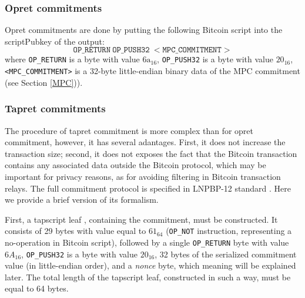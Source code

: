 \documentclass[9pt,oneside]{amsart}
\begin{document}
\begin{multicols}{2}
\subsubsection{Opret commitments}\label{Opret}

Opret commitments are done by putting the following Bitcoin script into the \textsf{scriptPubkey}
of the output:
\noindent
\begin{equation}
    \mathtt{OP\_RETURN\ OP\_PUSH32\ <MPC\_COMMITMENT>}
\end{equation}
where \texttt{OP\_RETURN} is a byte with value $\mathrm{6a}_{16}$,
\texttt{OP\_PUSH32} is a byte with value $20_{16}$,
\texttt{<MPC\_COMMITMENT>} is a 32-byte little-endian binary data of the MPC commitment
(see Section \ref{MPC})).

\subsubsection{Tapret commitments}\label{Tapret}

The procedure of tapret commitment is more complex than for opret commitment,
however, it has several adantages.
First, it does not increase the transaction size;
second, it does not exposes the fact that the Bitcoin transaction contains any associated
data outside the Bitcoin protocol, which may be important for privacy reasons,
as for avoiding filtering in Bitcoin transaction relays.
The full commitment protocol is specified in LNPBP-12 standard \cite{LNPBP12}.
Here we provide a brief version of its formalism.

First, a tapscript leaf \cite{BIP342}, containing the commitment, must be constructed.
It consists of 29 bytes with value equal to $61_{64}$
(\texttt{OP\_NOT} instruction, representing a no-operation in Bitcoin script),
followed by a single \texttt{OP\_RETURN} byte with value $6A_{16}$,
\texttt{OP\_PUSH32} is a byte with value $20_{16}$,
32 bytes of the serialized commitment value (in little-endian order),
and a \emph{nonce} byte, which meaning will be explained later.
The total length of the tapscript leaf, constructed in such a way, must be equal to 64 bytes.


\end{multicols}
\end{document}

